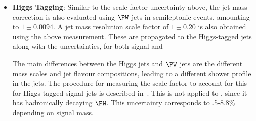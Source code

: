 \begin{itemize}
\item \textbf{Higgs Tagging}: Similar to the \nsub scale factor uncertainty above, the jet mass correction is also evaluated using $\PW$ jets in semileptonic \ttjets events, amounting to $1 \pm 0.0094$. A jet mass resolution scale factor of $1 \pm 0.20$ is also obtained using the above measurement. These are propagated to the Higgs-tagged jets along with the uncertainties, for both signal and \ttbar

The main differences between the Higgs jets and $\PW$ jets are the different mass scales and jet flavour compositions, leading to a different shower profile in the jets. The procedure for measuring the scale factor to account for this for Higgs-tagged signal jets is described in~\cite{CMS-PAS-B2G-16-026}.
This is not applied to \ttbar, since it has hadronically decaying $\PW$. This uncertainty corresponds to .5-8.8\% depending on signal mass.


\end{itemize}
